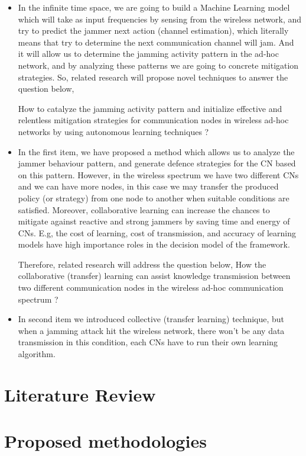 \documentclass[letterpaper%
, twoside%
, 12pt%
,thesepararticles%
, english%
,creativecommons,hyperref, withAlgo2e%
]{thETS}
\begin{document}
\begin{itemize}
 \item {In the infinite time space, we are going to build a Machine Learning model which will take as input frequencies by sensing from the wireless network, and try to predict the jammer next action (channel estimation), which literally means that try to determine the next communication channel will jam. And it will allow us to determine the jamming activity pattern in the ad-hoc network, and by analyzing these patterns we are going to concrete  mitigation strategies. So, related research will propose novel techniques to answer the question below,
     
     How to catalyze the jamming activity pattern and initialize effective and relentless mitigation strategies for communication nodes in wireless ad-hoc networks by using autonomous learning techniques ?}
 \item {In the first item, we have proposed a method which allows us to analyze the jammer behaviour pattern, and generate defence strategies for the CN based on this pattern. However, in the wireless spectrum we have two different CNs and we can have more nodes, in this case we may transfer the produced policy (or strategy) from one node to another when suitable conditions are satisfied. Moreover, collaborative learning can increase the chances to mitigate against reactive and strong jammers by saving time and energy of CNs. E.g, the cost of learning, cost of transmission, and accuracy of learning models have  high importance roles in the decision model of the framework. 
  
 	Therefore, related research will address the question below, 
 	How the collaborative (transfer) learning can assist knowledge transmission between two different communication nodes in the wireless ad-hoc communication spectrum ? 
 }

 \item{In second item we introduced collective (transfer learning) technique, but when a jamming attack hit the wireless network, there won't be any data transmission in this condition, each CNs have to run their own learning algorithm. } 
\end{itemize}




\chapter{Literature Review}


\chapter{Proposed methodologies}
\end{document}
